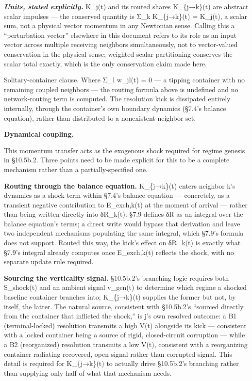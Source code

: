 \documentclass[
]{article}
\begin{document}
\emph{\textbf{Units, stated explicitly.}} K\_j(t) and its routed shares
K\_\{j→k\}(t) are abstract scalar impulses --- the conserved quantity is
Σ\_k K\_\{j→k\}(t) = K\_j(t), a scalar sum, not a physical vector
momentum in any Newtonian sense. Calling this a ``perturbation vector''
elsewhere in this document refers to its role as an input vector across
multiple receiving neighbors simultaneously, not to vector-valued
conservation in the physical sense; weighted scalar partitioning
conserves the scalar total exactly, which is the only conservation claim
made here.

Solitary-container clause. Where Σ\_l w\_jl(t) = 0 --- a tipping
container with no remaining coupled neighbors --- the routing formula
above is undefined and no network-routing term is computed. The
resolution kick is dissipated entirely internally, through the
container's own boundary dynamics (§7.4's balance equation), rather than
distributed to a nonexistent neighbor set.

\textbf{Dynamical coupling.}

This momentum transfer acts as the exogenous shock required for regime
genesis in §10.5b.2. Three points need to be made explicit for this to
be a complete mechanism rather than a partially-specified one.

\textbf{Routing through the balance equation.} K\_\{j→k\}(t) enters
neighbor k's dynamics as a shock term within §7.4's balance equation ---
concretely, as a transient negative contribution to E\_exch,k(t) at the
moment of arrival --- rather than being written directly into δR\_k(t).
§7.9 defines δR as an integral over the balance equation's terms; a
direct write would bypass that derivation and leave two independent
mechanisms populating the same integral, which §7.9's formula does not
support. Routed this way, the kick's effect on δR\_k(t) is exactly what
§7.9's integral already computes once E\_exch,k(t) reflects the shock,
with no separate update rule required.

\textbf{Sourcing the verticality signal.} §10.5b.2's branching logic
requires both S\_shock(t) and an ambient signal v\_gen(t) to determine
which regime a shocked baseline container branches into; K\_\{j→k\}(t)
supplies the former but not, by itself, the latter. The natural source,
consistent with §10.5b.2's ``sourced directly from the container that
inflicted the shock,'' is j's own resolved outcome: a B1
(terminal-locked) resolution transmits a high V(t) alongside its kick
--- consistent with a locked container being a source of rigid,
closed-circuit corruption --- while a B2 (reorganized) resolution
transmits a low V(t), consistent with a reorganizing container radiating
recovered, open signal rather than corrupted signal. This detail is
required for K\_\{j→k\}(t) to actually drive §10.5b.2's branching rather
than supplying only half of what that mechanism needs.
\end{document}
